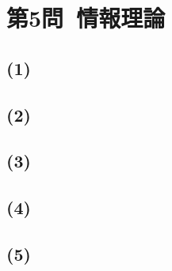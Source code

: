 \documentclass[a4paper,12pt,xelatex,ja=standard]{bxjsarticle}
\begin{document}
\section*{第5問\ 情報理論}
\subsection*{(1)}

\subsection*{(2)}

\subsection*{(3)}

\subsection*{(4)}

\subsection*{(5)}
\end{document}
